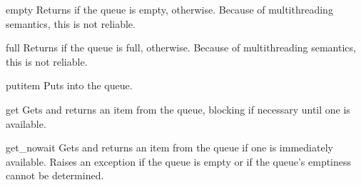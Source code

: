 \begin{methoddesc}{empty}{}
Returns  if the queue is empty,  otherwise.  Because
of multithreading semantics, this is not reliable.
\end{methoddesc}

\begin{methoddesc}{full}{}
Returns  if the queue is full,  otherwise.  Because of
multithreading semantics, this is not reliable.
\end{methoddesc}

\begin{methoddesc}{put}{item}
Puts  into the queue.
\end{methoddesc}

\begin{methoddesc}{get}{}
Gets and returns an item from the queue, blocking if necessary until
one is available.
\end{methoddesc}

\begin{methoddesc}{get_nowait}{}
Gets and returns an item from the queue if one is immediately
available.  Raises an  exception if the queue is
empty or if the queue's emptiness cannot be determined.
\end{methoddesc}

